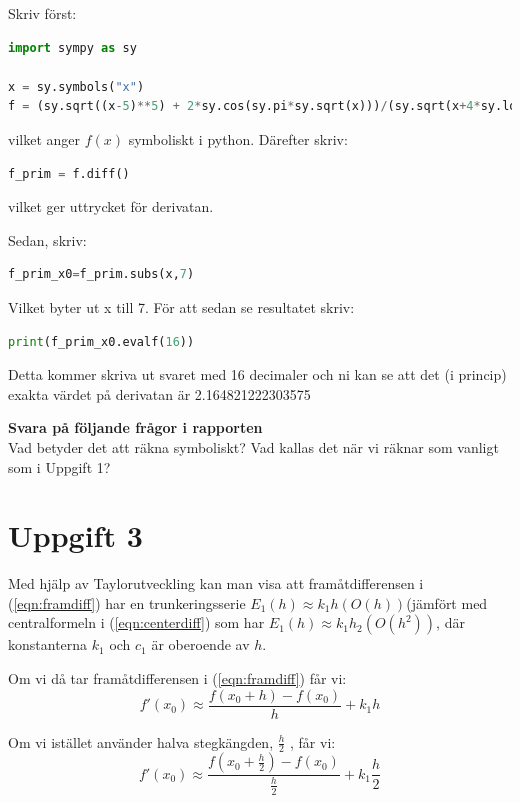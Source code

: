 \documentclass[a4paper]{article}
\begin{document}
Skriv först:
\begin{lstlisting}[language=Python]
import sympy as sy

x = sy.symbols("x")
f = (sy.sqrt((x-5)**5) + 2*sy.cos(sy.pi*sy.sqrt(x)))/(sy.sqrt(x+4*sy.log(x-sy.pi))-1))
\end{lstlisting}
vilket anger \( f(x) \) symboliskt i python. Därefter skriv:

\begin{lstlisting}[language=Python]
  f_prim = f.diff()
\end{lstlisting}
vilket ger uttrycket för derivatan. 

Sedan, skriv:

\begin{lstlisting}[language=Python]
  f_prim_x0=f_prim.subs(x,7)
\end{lstlisting}
Vilket byter ut x till 7. För att sedan se resultatet skriv:

\begin{lstlisting}[language=Python]
  print(f_prim_x0.evalf(16))
\end{lstlisting}
Detta kommer skriva ut svaret med 16 decimaler och ni kan se 
att det (i princip) exakta värdet på derivatan är 2.164821222303575


\textbf{Svara på följande frågor i rapporten}\\
Vad betyder det att räkna symboliskt? 
Vad kallas det när vi räknar som vanligt som i Uppgift 1?

\newpage
\section{Uppgift 3}

Med hjälp av Taylorutveckling kan man visa att framåtdifferensen i (\ref{eqn:framdiff}) har 
en trunkeringsserie \( E_1(h)\approx k_1h(O(h)) \)(jämfört med centralformeln i (\ref{eqn:centerdiff}) 
som har \(E_1(h)\approx k_1h_2(O(h^2))\), där konstanterna \(k_1\)  och \(c_1\)  är oberoende av \(h\).

Om vi då tar framåtdifferensen i (\ref{eqn:framdiff}) får vi:
\begin{equation} \label{eqn:framdiff_k}
f'(x_0)\approx \frac{f(x_0+h)-f(x_0)}{h}+k_1h
\end{equation}

Om vi istället använder halva stegkängden, \( \frac{h}{2} \) , får vi:
\begin{equation} \label{eqn:framdiff_halva_h}
f'(x_0)\approx \frac{f(x_0+\frac{h}{2})-f(x_0)}{\frac{h}{2}}+k_1 \frac{h}{2}
\end{equation}
\end{document}
